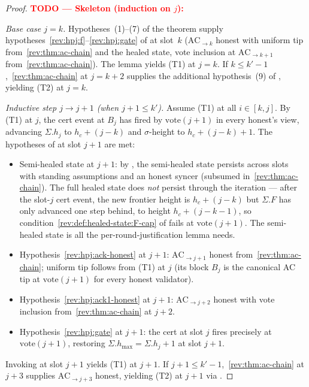\documentclass{article}
\newcommand{\hmax}{\ensuremath{h_{\max}}\xspace}
\newcommand{\vote}{\ensuremath{\mathrm{vote}}}
\theoremstyle{plain}
\theoremstyle{definition}
\theoremstyle{remark}
\begin{document}
\begin{proof}
\textcolor{red}{\textbf{TODO --- Skeleton (induction on $j$):}}

\emph{Base case $j = k$.} Hypotheses~(1)--(7) of the theorem supply hypotheses~\ref{rev:hpj:f}--\ref{rev:hpj:gate} of  at slot~$k$ ($\mathrm{AC}_{\to k}$ honest with uniform tip from~\ref{rev:thm:ac-chain} and the healed state, vote inclusion at $\mathrm{AC}_{\to k+1}$ from~\ref{rev:thm:ac-chain}). The lemma yields (T1) at $j = k$. If $k \leq k' - 1$,~\ref{rev:thm:ac-chain} at $j = k+2$ supplies the additional hypothesis~(9) of , yielding (T2) at $j = k$.

\emph{Inductive step $j \to j+1$ (when $j+1 \leq k'$).} Assume (T1) at all $i \in [k, j]$.
By (T1) at $j$, the cert event at $B_j$ has fired by $\vote(j+1)$ in every honest's view, advancing $\Sigma.h_j$ to $h_c + (j - k)$ and $\sigma$-height to $h_c + (j - k) + 1$. The hypotheses of  at slot $j+1$ are met:
\begin{itemize}
  \item Semi-healed state at $j+1$: by , the semi-healed state persists across slots with standing assumptions and an honest syncer (subsumed in~\ref{rev:thm:ac-chain}). The full healed state does \emph{not} persist through the iteration --- after the slot-$j$ cert event, the new frontier height is $h_c + (j-k)$ but $\Sigma.F$ has only advanced one step behind, to height $h_c + (j-k-1)$, so condition~\ref{rev:def:healed-state:F-cap} of  fails at $\vote(j+1)$. The semi-healed state is all the per-round-justification lemma needs.
  \item Hypothesis~\ref{rev:hpj:ack-honest} at $j+1$: $\mathrm{AC}_{\to j+1}$ honest from~\ref{rev:thm:ac-chain}; uniform tip follows from (T1) at $j$ (its block $B_j$ is the canonical AC tip at $\vote(j+1)$ for every honest validator).
  \item Hypothesis~\ref{rev:hpj:ack1-honest} at $j+1$: $\mathrm{AC}_{\to j+2}$ honest with vote inclusion from~\ref{rev:thm:ac-chain} at $j+2$.
  \item Hypothesis~\ref{rev:hpj:gate} at $j+1$: the cert at slot $j$ fires precisely at $\vote(j+1)$, restoring $\Sigma.\hmax = \Sigma.h_j + 1$ at slot $j+1$.
\end{itemize}
Invoking  at slot $j+1$ yields (T1) at $j+1$. If $j+1 \leq k' - 1$,~\ref{rev:thm:ac-chain} at $j+3$ supplies $\mathrm{AC}_{\to j+3}$ honest, yielding (T2) at $j+1$ via .
\end{proof}
\end{document}
